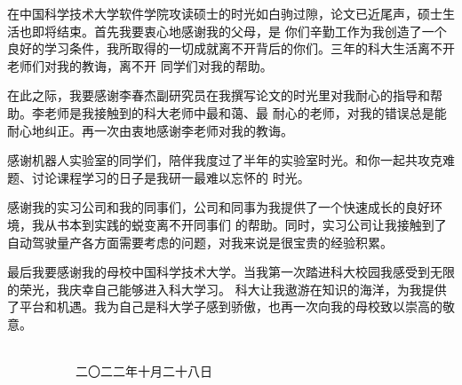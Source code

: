 
\begin{acknowledgements}
在中国科学技术大学软件学院攻读硕士的时光如白驹过隙，论文已近尾声，硕士生活也即将结束。首先我要衷心地感谢我的父母，是
你们辛勤工作为我创造了一个良好的学习条件，我所取得的一切成就离不开背后的你们。三年的科大生活离不开老师们对我的教诲，离不开
同学们对我的帮助。

在此之际，我要感谢李春杰副研究员在我撰写论文的时光里对我耐心的指导和帮助。李老师是我接触到的科大老师中最和蔼、最
耐心的老师，对我的错误总是能耐心地纠正。再一次由衷地感谢李老师对我的教诲。

感谢机器人实验室的同学们，陪伴我度过了半年的实验室时光。和你一起共攻克难题、讨论课程学习的日子是我研一最难以忘怀的
时光。

感谢我的实习公司和我的同事们，公司和同事为我提供了一个快速成长的良好环境，我从书本到实践的蜕变离不开同事们
的帮助。同时，实习公司让我接触到了自动驾驶量产各方面需要考虑的问题，对我来说是很宝贵的经验积累。

最后我要感谢我的母校中国科学技术大学。当我第一次踏进科大校园我感受到无限的荣光，我庆幸自己能够进入科大学习。
科大让我遨游在知识的海洋，为我提供了平台和机遇。我为自己是科大学子感到骄傲，也再一次向我的母校致以崇高的敬意。

~~~~~~~~~~~~~~~~~~~~~~~~~~~~~~~~~~~~~~~~~~~~~~~~~~~~~~~~~~~~~~~~~~~~~~~~~~~~~~~~~~~二〇二二年十月二十八日

\end{acknowledgements}
